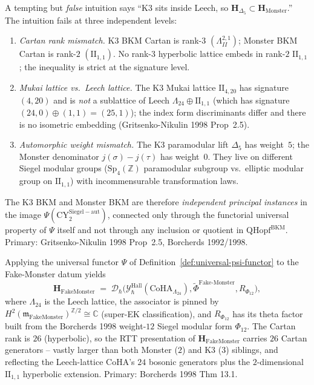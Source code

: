 \begin{remark}
\label{rem:k3ebkm-k3-monster-distinct}
A tempting but \emph{false} intuition says ``K3 sits inside Leech, so
$\mathbf H_{\Delta_5}\subset\mathbf H_{\mathrm{Monster}}$.'' The
intuition fails at three independent levels:
\begin{enumerate}
\item \emph{Cartan rank mismatch.} K3 BKM Cartan is rank-$3$
$(\Lambda^{2,1}_{II})$; Monster BKM Cartan is rank-$2$ $(\mathrm{II}_{1,1})$.
No rank-$3$ hyperbolic lattice embeds in rank-$2$ $\mathrm{II}_{1,1}$;
the inequality is strict at the signature level.
\item \emph{Mukai lattice vs.\ Leech lattice.} The K3 Mukai lattice
$\mathrm{II}_{4,20}$ has signature $(4,20)$ and is \emph{not} a
sublattice of Leech $\Lambda_{24}\oplus\mathrm{II}_{1,1}$
(which has signature $(24,0)\oplus(1,1) = (25,1)$); the index form
discriminants differ and there is no isometric embedding
(Gritsenko-Nikulin 1998 Prop~2.5).
\item \emph{Automorphic weight mismatch.} The K3 paramodular lift
$\Delta_5$ has weight~$5$; the Monster denominator $j(\sigma)-j(\tau)$
has weight~$0$. They live on different Siegel modular groups
($\mathrm{Sp}_4(\mathbb Z)$ paramodular subgroup vs.\ elliptic modular
group on $\mathrm{II}_{1,1}$) with incommensurable transformation
laws.
\end{enumerate}
The K3 BKM and Monster BKM are therefore \emph{independent principal instances}
in the image $\Psi(\mathrm{CY}^{\mathrm{Siegel-aut}}_2)$, connected only
through the functorial universal property of $\Psi$ itself and not
through any inclusion or quotient in $\mathrm{QHopf}^{\mathrm{BKM}}$.
Primary: Gritsenko-Nikulin 1998 Prop~2.5, Borcherds 1992/1998.
\end{remark}

\begin{remark}
\label{rem:k3ebkm-fake-monster-psi}
Applying the universal functor $\Psi$ of
Definition~\ref{def:universal-psi-functor} to the Fake-Monster
datum yields
\[
 \mathbf H_{\mathrm{FakeMonster}}
 \;=\;
 \mathcal D_\hbar\bigl(\mathcal Y^{\mathrm{Hall}}_\hbar(\mathrm{CoHA}_{\Lambda_{24}}),
 \widetilde\Phi^{\mathrm{Fake\text{-}Monster}},
 R_{\Phi_{12}}\bigr),
\]
where $\Lambda_{24}$ is the Leech lattice, the associator is pinned by
$H^2(\mathfrak m_{\mathrm{FakeMonster}})^{\mathbb Z/2}\cong\mathbb C$
(super-EK classification), and $R_{\Phi_{12}}$ has its theta factor
built from the Borcherds 1998 weight-$12$ Siegel modular form $\Phi_{12}$.
The Cartan rank is $26$ (hyperbolic), so the RTT presentation of
$\mathbf H_{\mathrm{FakeMonster}}$ carries $26$ Cartan generators --
vastly larger than both Monster ($2$) and K3 ($3$) siblings, and
reflecting the Leech-lattice CoHA's $24$ bosonic generators plus the
$2$-dimensional $\mathrm{II}_{1,1}$ hyperbolic extension.
Primary: Borcherds 1998 Thm 13.1.
\end{remark}

